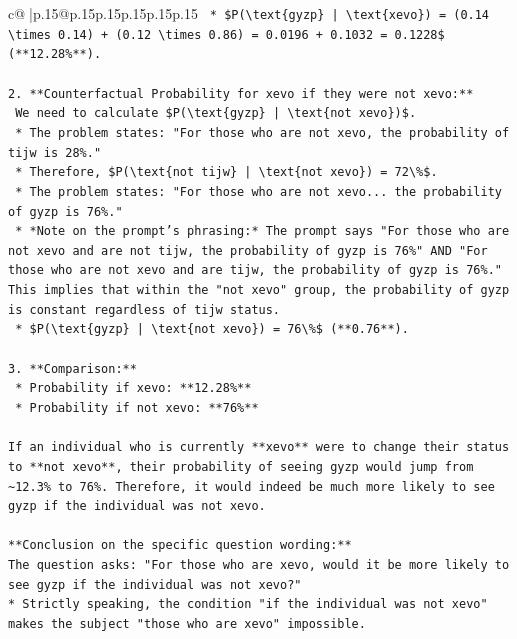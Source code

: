 \documentclass{article}
\begin{document}
{\begin{supertabular}{c@{$\;$}|p{.15\linewidth}@{}p{.15\linewidth}p{.15\linewidth}p{.15\linewidth}p{.15\linewidth}p{.15\linewidth}}
{{{\texttt{    *   \$P(\textbackslash{}text\{gyzp\} | \textbackslash{}text\{xevo\}) = (0.14 \textbackslash{}times 0.14) + (0.12 \textbackslash{}times 0.86) = 0.0196 + 0.1032 = 0.1228\$ (**12.28\%**).} \\
\\ 
\texttt{2.  **Counterfactual Probability for xevo if they were not xevo:**} \\
\texttt{    We need to calculate \$P(\textbackslash{}text\{gyzp\} | \textbackslash{}text\{not xevo\})\$.} \\
\texttt{    *   The problem states: "For those who are not xevo, the probability of tijw is 28\%."} \\
\texttt{    *   Therefore, \$P(\textbackslash{}text\{not tijw\} | \textbackslash{}text\{not xevo\}) = 72\textbackslash{}\%\$.} \\
\texttt{    *   The problem states: "For those who are not xevo... the probability of gyzp is 76\%."} \\
\texttt{        *   *Note on the prompt's phrasing:* The prompt says "For those who are not xevo and are not tijw, the probability of gyzp is 76\%" AND "For those who are not xevo and are tijw, the probability of gyzp is 76\%." This implies that within the "not xevo" group, the probability of gyzp is constant regardless of tijw status.} \\
\texttt{    *   \$P(\textbackslash{}text\{gyzp\} | \textbackslash{}text\{not xevo\}) = 76\textbackslash{}\%\$ (**0.76**).} \\
\\ 
\texttt{3.  **Comparison:**} \\
\texttt{    *   Probability if xevo: **12.28\%**} \\
\texttt{    *   Probability if not xevo: **76\%**} \\
\\ 
\texttt{If an individual who is currently **xevo** were to change their status to **not xevo**, their probability of seeing gyzp would jump from \textasciitilde{}12.3\% to 76\%. Therefore, it would indeed be much more likely to see gyzp if the individual was not xevo.} \\
\\ 
\texttt{**Conclusion on the specific question wording:**} \\
\texttt{The question asks: "For those who are xevo, would it be more likely to see gyzp if the individual was not xevo?"} \\
\texttt{*   Strictly speaking, the condition "if the individual was not xevo" makes the subject "those who are xevo" impossible.} \\
}}}
\end{supertabular}}
\end{document}
